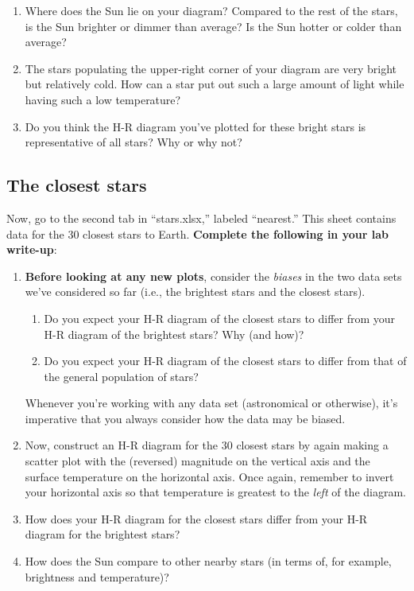 \documentclass[11pt]{article}
\begin{document}
\begin{enumerate}
    \item Where does the Sun lie on your diagram? Compared to the rest of the stars, is the Sun brighter or dimmer than average? Is the Sun hotter or colder than average?
    
    \item The stars populating the upper-right corner of your diagram are very bright but relatively cold. How can a star put out such a large amount of light while having such a low temperature?
    
    \item Do you think the H-R diagram you've plotted for these bright stars is representative of all stars? Why or why not?
    
\end{enumerate}

\pagebreak
\subsection{The closest stars}
Now, go to the second tab in ``stars.xlsx,'' labeled ``nearest.'' This sheet contains data for the 30 closest stars to Earth. \textbf{Complete the following in your lab write-up}:
\begin{enumerate}
    \item \textbf{Before looking at any new plots}, consider the \emph{biases} in the two data sets we've considered so far (i.e., the brightest stars and the closest stars). 
    \begin{enumerate}
        \item Do you expect your H-R diagram of the closest stars to differ from your H-R diagram of the brightest stars? Why (and how)?
        
        \item Do you expect your H-R diagram of the closest stars to differ from that of the general population of stars?
    \end{enumerate}
    Whenever you're working with any data set (astronomical or otherwise), it's imperative that you always consider how the data may be biased.
    
    \item Now, construct an H-R diagram for the 30 closest stars by again making a scatter plot with the (reversed) magnitude on the vertical axis and the surface temperature on the horizontal axis. Once again, remember to invert your horizontal axis so that temperature is greatest to the \emph{left} of the diagram.
    
    \item How does your H-R diagram for the closest stars differ from your H-R diagram for the brightest stars?
    
    \item How does the Sun compare to other nearby stars (in terms of, for example, brightness and temperature)?
    
\end{enumerate}
\end{document}
